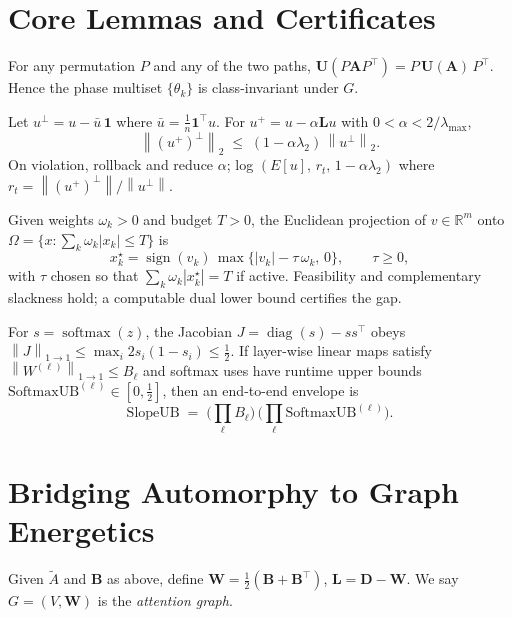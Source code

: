 \documentclass[11pt]{article}
\newcommand{\R}{\mathbb{R}}
\newcommand{\one}{\mathbf{1}}
\newcommand{\softmax}{\operatorname{softmax}}
\newcommand{\diag}{\operatorname{diag}}
\newcommand{\norm}[1]{\left\lVert #1 \right\rVert}
\newcommand{\abs}[1]{\left\lvert #1 \right\rvert}
\newcommand{\bA}{\mathbf{A}}
\newcommand{\bB}{\mathbf{B}}
\newcommand{\bU}{\mathbf{U}}
\newcommand{\bL}{\mathbf{L}}
\newcommand{\bD}{\mathbf{D}}
\newcommand{\bW}{\mathbf{W}}
\begin{document}
\section{Core Lemmas and Certificates}
\begin{lem}\label{lem:perm-eq}
For any permutation $P$ and any of the two paths, $\bU(P\bA P^\top)=P\,\bU(\bA)\,P^\top$. Hence the phase multiset $\{\theta_k\}$ is class-invariant under $G$.
\end{lem}

\begin{prop}\label{prop:contraction}
Let $u^\perp=u-\bar u\,\one$ where $\bar u=\tfrac1n \one^\top u$. For $u^+=u-\alpha \bL u$ with $0<\alpha<2/\lambda_{\max}$,
\[
\norm{(u^+)^\perp}_2 \;\le\; (1-\alpha \lambda_2)\, \norm{u^\perp}_2.
\]
On violation, rollback and reduce $\alpha$; log $(E[u],\, r_t,\, 1-\alpha\lambda_2)$ where $r_t=\norm{(u^+)^\perp}/\norm{u^\perp}$.
\end{prop}

\begin{prop}\label{prop:ace}
Given weights $\omega_k>0$ and budget $T>0$, the Euclidean projection of $v\in\R^m$ onto $\Omega=\{x: \sum_k \omega_k \abs{x_k}\le T\}$ is
\[
x_k^\star=\operatorname{sign}(v_k)\,\max\{\abs{v_k}-\tau\,\omega_k,\,0\},\qquad \tau\ge 0,
\]
with $\tau$ chosen so that $\sum_k \omega_k\abs{x_k^\star}=T$ if active. Feasibility and complementary slackness hold; a computable dual lower bound certifies the gap.
\end{prop}

\begin{prop}\label{prop:softmax}
For $s=\softmax(z)$, the Jacobian $J=\diag(s)-ss^\top$ obeys $\norm{J}_{1\to 1}\le \max_i 2 s_i(1-s_i)\le \tfrac12$. If layer-wise linear maps satisfy $\norm{W^{(\ell)}}_{1\to 1}\le B_\ell$ and softmax uses have runtime upper bounds $\mathrm{SoftmaxUB}^{(\ell)}\in[0,\tfrac12]$, then an end-to-end envelope is
\[
\mathrm{SlopeUB} \;=\; \Big(\prod_\ell B_\ell\Big)\,\Big(\prod_\ell \mathrm{SoftmaxUB}^{(\ell)}\Big).
\]
\end{prop}

\section{Bridging Automorphy to Graph Energetics}
\begin{defn}
Given $\tilde A$ and $\bB$ as above, define $\bW=\tfrac12(\bB+\bB^\top)$, $\bL=\bD-\bW$. We say $G=(V,\bW)$ is the \emph{attention graph}.
\end{defn}
\end{document}
